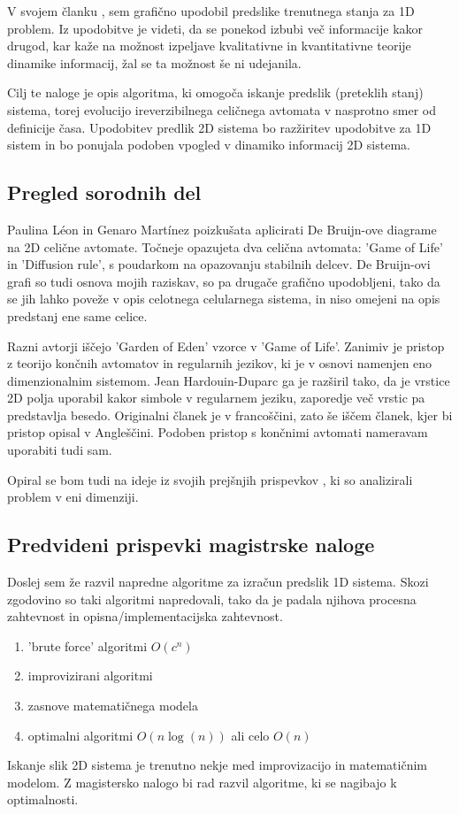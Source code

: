 \documentclass[a4paper, 12pt]{article}
\begin{document}
V svojem članku \cite{JerasDobnikar2007}, sem grafično upodobil predslike trenutnega stanja za 1D problem.
Iz upodobitve je videti, da se ponekod izbubi več informacije kakor drugod,
kar kaže na možnost izpeljave kvalitativne in kvantitativne teorije dinamike informacij, žal se ta možnost še ni udejanila.

Cilj te naloge je opis algoritma, ki omogoča iskanje predslik (preteklih stanj) sistema, torej evolucijo
ireverzibilnega celičnega avtomata v nasprotno smer od definicije časa.
Upodobitev predlik 2D sistema bo razžiritev upodobitve za 1D sistem
in bo ponujala podoben vpogled v dinamiko informacij 2D sistema.

\subsection{Pregled sorodnih del}

Paulina Léon in Genaro Martínez \cite{PaulinaGenaro2016} poizkušata aplicirati
De Bruijn-ove diagrame na 2D celične avtomate. Točneje opazujeta dva celična avtomata:
'Game of Life' in 'Diffusion rule', s poudarkom na opazovanju stabilnih delcev.
De Bruijn-ovi grafi so tudi osnova mojih raziskav, so pa drugače grafično upodobljeni,
tako da se jih lahko poveže v opis celotnega celularnega sistema, in niso omejeni na
opis predstanj ene same celice.

Razni avtorji \cite{Hartman2013} iščejo 'Garden of Eden' vzorce v 'Game of Life'.
Zanimiv je pristop z teorijo končnih avtomatov in regularnih jezikov, ki je v
osnovi namenjen eno dimenzionalnim sistemom. Jean Hardouin-Duparc ga je razširil
tako, da je vrstice 2D polja uporabil kakor simbole v regularnem jeziku, zaporedje več
vrstic pa predstavlja besedo. Originalni članek je v francoščini, zato še iščem članek,
kjer bi pristop opisal v Angleščini. Podoben pristop s končnimi avtomati nameravam uporabiti tudi sam.

Opiral se bom tudi na ideje iz svojih prejšnjih prispevkov \cite{JerasDobnikar2007}
\cite{DBLP:conf/iccS/JerasD06} \cite{DBLP:conf/automata/Jeras08},
ki so analizirali problem v eni dimenziji.

\subsection{Predvideni prispevki magistrske naloge}

Doslej sem že razvil napredne algoritme za izračun predslik 1D sistema.
Skozi zgodovino so taki algoritmi napredovali, tako da je padala njihova
procesna zahtevnost in opisna/implementacijska zahtevnost.
\begin{enumerate}
\item 'brute force' algoritmi \( O(c^n) \)
\item improvizirani algoritmi
\item zasnove matematičnega modela
\item optimalni algoritmi \( O(n \log(n)) \) ali celo \( O(n) \)
\end{enumerate}
Iskanje slik 2D sistema je trenutno nekje med improvizacijo in matematičnim modelom.
Z magistersko nalogo bi rad razvil algoritme, ki se nagibajo k optimalnosti.
\end{document}
